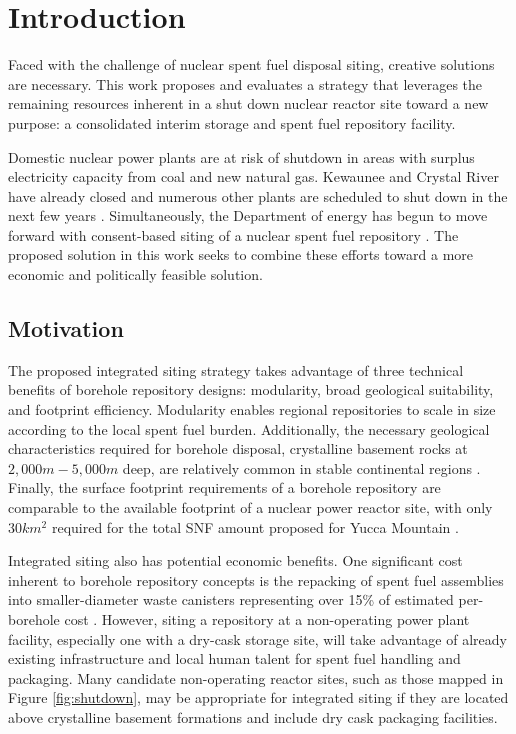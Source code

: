 
\section{Introduction}
Faced with the challenge of nuclear spent fuel disposal siting, creative solutions 
are necessary. This work proposes and evaluates a strategy that leverages the 
remaining resources inherent in a shut down nuclear reactor site toward a new 
purpose: a consolidated interim storage and spent fuel repository facility.

Domestic nuclear power plants are at risk of shutdown in areas with surplus 
electricity capacity from coal and new natural gas. Kewaunee and Crystal River 
have already closed  and numerous other plants are scheduled to shut down in 
the next few years \cite{nei_shutdowns_2016}.  Simultaneously, the Department 
of energy has begun to move forward with consent-based siting of a nuclear 
spent fuel repository \cite{doe_consent_2016}. The proposed solution in this 
work seeks to combine these efforts toward a more economic and politically 
feasible solution. 


\subsection{Motivation}
The proposed integrated siting strategy takes advantage of three technical 
benefits of borehole repository designs: modularity, broad geological 
suitability, and footprint efficiency. Modularity enables regional repositories 
to scale in size according to the local spent fuel burden. 
Additionally, the necessary geological characteristics required for borehole 
disposal, crystalline basement rocks at $2,000 m - 5,000 m$ deep, are relatively 
common in stable continental regions \cite{arnold_research_2012}. Finally, the 
surface footprint requirements of a borehole repository are comparable to the 
available footprint of a nuclear power reactor site, with only $30 km^2$ 
required for the total \gls{SNF} amount proposed for Yucca Mountain 
\cite{brady_deep_2009}.

Integrated siting also has potential economic benefits. One significant cost 
inherent to borehole repository concepts is the repacking of spent fuel 
assemblies into smaller-diameter waste canisters representing over 15\% of 
estimated per-borehole cost \cite{arnold_reference_2011}.  However, siting a 
repository at a non-operating power plant facility, especially one with a 
dry-cask storage site, will take advantage of already existing infrastructure 
and local human talent for spent fuel handling and packaging. Many candidate 
non-operating reactor sites, such as those mapped in Figure \ref{fig:shutdown}, 
may be appropriate for integrated siting if they are located above crystalline 
basement formations and include dry cask packaging facilities.

